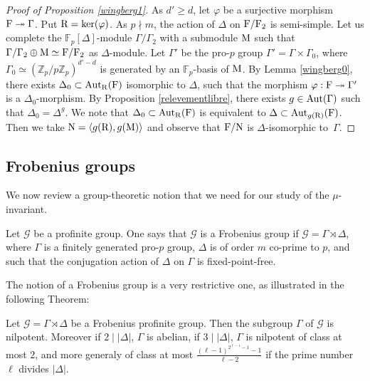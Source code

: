 \documentclass[12pt,a4paper,twoside,english]{smfart}
\def\F{{\rm F}}
\def\Z{{\mathbb Z}}
\def\fq{{\mathbb F}}
\def\N{{\rm N}}
\def\R{{\rm R}}
\def\G{{\mathcal G}}
\def\MM{{\rm M}}
\def\Aut{{\rm Aut}}
\def\ker{{\rm ker}}
\begin{document}
 
\begin{proof}[Proof of Proposition \ref{wingberg1}] As $d'\geq d$, let $\varphi$ be a surjective morphism $\F \twoheadrightarrow \Gamma$. Put $\R=\ker(\varphi)$.
As $p\nmid m$, the action of $\Delta$ on $\F/\F_2$ is semi-simple. Let us complete the $\fq_p[\Delta]$-module $\Gamma/\Gamma_2$ with a submodule $\MM$ such that $\Gamma/\Gamma_2 \oplus \MM \simeq \F/\F_2$ as   $\Delta$-module.
Let $\Gamma'$ be the pro-$p$ group $\Gamma'=\Gamma \times \Gamma_0$, where $\Gamma_0 \simeq \left(\Z_p/p\Z_p\right)^{d'-d}$ is generated by an $\fq_p$-basis of $\MM$.
By Lemma \ref{wingberg0}, there exists $\Delta_0 \subset \Aut_\R(\F)$ isomorphic to $\Delta$, such that the morphism $\varphi : \F \twoheadrightarrow \Gamma'$  is  a $\Delta_0$-morphism.
By Proposition \ref{relevementlibre}, there exists $g\in \Aut(\Gamma)$ such that $\Delta_0=\Delta^g$.
We note that $\Delta_0 \subset \Aut_\R(\F) $ is equivalent to $\Delta \subset \Aut_{g(\R)}(\F)$.
Then we take $\N=\langle g(\R), g(\MM) \rangle $ and observe  that $\F/\N$ is $\Delta$-isomorphic to~$\Gamma$.
\end{proof}
   

 
  \subsection{Frobenius groups}
We now review a group-theoretic notion that we need for our study of the $\mu$-invariant. 
  
  
  
 \begin{defi} Let $\G$ be a profinite group. One says that $\G$ is a Frobenius group  if  $\G= \Gamma \rtimes \Delta$, where
 $\Gamma$ is a finitely generated pro-$p$ group, $\Delta$ is  of order  $m$ co-prime to $p$, and such that  the conjugation action  of $\Delta$ on 
  $\Gamma$ is fixed-point-free. 
 \end{defi}

The notion of a Frobenius group is a very restrictive one, as illustrated in the following Theorem:

 \begin{theo}\label{RZ}
 Let $\G=\Gamma \rtimes \Delta$ be a Frobenius profinite group. 
 Then the subgroup $\Gamma$ of $\G$ is  nilpotent.  Moreover if $2 \mid  |\Delta |$, $\Gamma$ is abelian, if $3\mid |\Delta|$, $\Gamma$ is  nilpotent of class at most $2$, and more generaly 
  of class at most $\displaystyle{\frac{(\ell-1)^{2^{\ell-1}-1}-1}{\ell-2}}$ if the prime number  $\ell$ divides $|\Delta|$.
 \end{theo}
\end{document}
